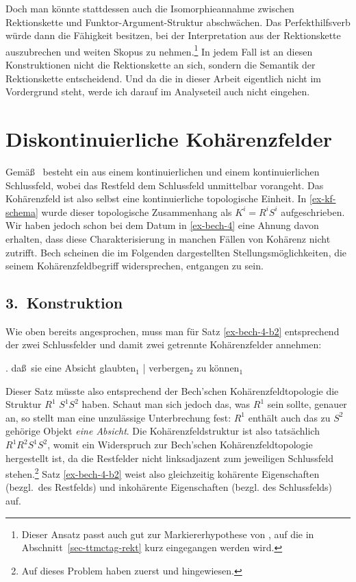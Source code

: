 Doch man könnte stattdessen auch die Isomorphieannahme zwischen Rektionskette und Funktor-Argument-Struktur abschwächen. Das Perfekthilfsverb würde dann die Fähigkeit besitzen, bei der Interpretation aus der Rektionskette auszubrechen und weiten Skopus zu nehmen.\footnote{Dieser Ansatz passt auch gut zur Markiererhypothese von \citet[Abschnitt~8.2]{Meurers:99}, auf die in Abschnitt~\ref{sec-ttmctag-rekt} kurz eingegangen werden wird.} In jedem Fall ist an diesen Konstruktionen nicht die Rektionskette an sich, sondern die Semantik der Rektionskette entscheidend. Und da die in dieser Arbeit eigentlich nicht im Vordergrund steht, werde ich darauf im Analyseteil auch nicht eingehen.  

\section{Diskontinuierliche Kohärenzfelder} \label{sec-permutation-kohaerenzfeld}

Gemä\ss\ \cite{Bech:55} besteht ein  aus einem kontinuierlichen  und einem kontinuierlichen Schlussfeld, wobei das Restfeld dem Schlussfeld unmittelbar vorangeht.  Das Kohärenzfeld ist also selbst eine kontinuierliche topologische Einheit. In \ref{ex-kf-schema} wurde dieser topologische Zusammenhang als $K^i = R^i S^i$ aufgeschrieben.  Wir haben jedoch schon bei dem Datum in \ref{ex-bech-4} eine Ahnung davon erhalten, dass diese Charakterisierung in manchen Fällen von Kohärenz nicht zutrifft. Bech scheinen die im Folgenden dargestellten Stellungsmöglichkeiten, die seinem Kohärenzfeldbegriff widersprechen, entgangen zu sein. 

\subsection{3.~Konstruktion}

Wie oben bereits angesprochen, muss man für Satz \ref{ex-bech-4-b2} entsprechend der  zwei Schlussfelder und damit zwei getrennte Kohärenzfelder annehmen: 

\ex. da\ss\ sie eine Absicht glaubten$_1$ | verbergen$_2$ zu können$_1$ \label{ex-bech-4-b2}

Dieser Satz müsste also entsprechend der Bech'schen Kohärenzfeldtopologie die Struktur $R^1$ $S^1 S^2$ haben. Schaut man sich jedoch das, was $R^1$ sein sollte, genauer an, so stellt man eine unzulässige Unterbrechung fest: $R^1$ enthält auch das zu $S^2$ gehörige Objekt {\it eine Absicht}. Die Kohärenzfeldstruktur ist also tatsächlich $R^1 R^2 S^1 S^2$, womit ein Widerspruch zur Bech'schen Kohärenzfeldtopologie hergestellt ist, da die Restfelder nicht linksadjazent zum jeweiligen Schlussfeld stehen.\footnote{Auf dieses Problem haben zuerst \cite{Kvam:79} und \citet[331, Fußnote 4]{Hoehle:86} hingewiesen.} Satz \ref{ex-bech-4-b2} weist also gleichzeitig kohärente Eigenschaften (bezgl.\ des Restfelds) und inkohärente Eigenschaften (bezgl. des Schlussfelds) auf.  


